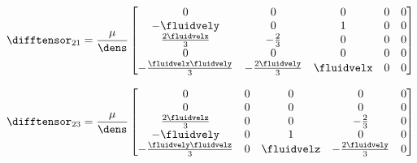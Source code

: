 \documentclass[../main.tex]{subfiles}
\begin{document}
\begin{minipage}{0.50\textwidth}
	\def\kto{ -\fluidvely }
	\def\keo{ \frac{2\fluidvelx}{3} }
	\def\kso{ -\frac{\fluidvelx\fluidvely}{3} }
	
	\def\ket{ -\frac{2}{3} }
	\def\kst{ -\frac{2\fluidvely}{3} }
	
	\def\kte{ 1 }
	\def\kse{ \fluidvelx }
	\begin{align}\nonumber
	\difftensor_{21}=\frac{\mu}{\dens}
	\begin{bmatrix}
	  0     &    0     &    0     &    0     &    0     \\ %
	  \kto  &    0     &    \kte  &    0     &    0     \\ %
	  \keo  &    \ket  &    0     &    0     &    0     \\ %
	  0     &    0     &    0     &    0     &    0     \\ %
	  \kso  &    \kst  &    \kse  &    0     &    0     \\ %
	\end{bmatrix}
	\end{align}
\end{minipage}
\begin{minipage}{0.50\textwidth}
	\def\keo{ \frac{2\fluidvelz}{3} }
	\def\kao{ -\fluidvely }
	\def\kso{ -\frac{\fluidvely\fluidvelz}{3} }
	
	\def\kae{ 1 }
	\def\kse{ \fluidvelz }
	
	\def\kea{ -\frac{2}{3} }
	\def\ksa{ -\frac{2\fluidvely}{3} }
	\begin{align}\nonumber
	\difftensor_{23}=\frac{\mu}{\dens}
	\begin{bmatrix}
	  0     &    0     &    0     &    0     &    0     \\ %
	  0     &    0     &    0     &    0     &    0     \\ %
	  \keo  &    0     &    0     &    \kea  &    0     \\ %
	  \kao  &    0     &    \kae  &    0     &    0     \\ %
	  \kso  &    0     &    \kse  &    \ksa  &    0     \\ %
	\end{bmatrix}
	\end{align}
\end{minipage}
\end{document}
